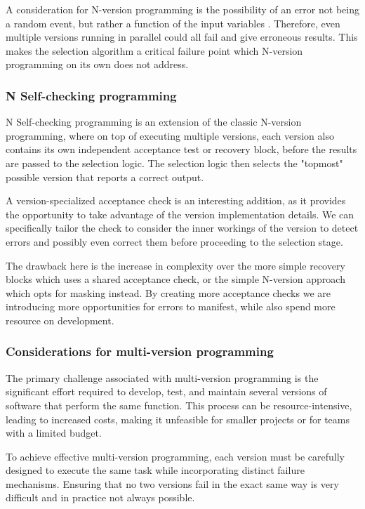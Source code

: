 \documentclass[12pt, letterpaper]{article}
\begin{document}
A consideration for N-version programming is the possibility of an error not being a random event, but rather a function of the input variables \cite{5326}. Therefore, even multiple versions running in parallel could all fail and give erroneous results. This makes the selection algorithm a critical failure point which N-version programming on its own does not address.

\subsubsection{N Self-checking programming}

N Self-checking programming is an extension of the classic N-version programming, where on top of executing multiple versions, each version also contains its own independent acceptance test or recovery block, before the results are passed to the selection logic. The selection logic then selects the "topmost" possible version that reports a correct output.

A version-specialized acceptance check is an interesting addition, as it provides the opportunity to take advantage of the version implementation details. We can specifically tailor the check to consider the inner workings of the version to detect errors and possibly even correct them before proceeding to the selection stage.

The drawback here is the increase in complexity over the more simple recovery blocks which uses a shared acceptance check, or the simple N-version approach which opts for masking instead. By creating more acceptance checks we are introducing more opportunities for errors to manifest, while also spend more resource on development.


\subsubsection{Considerations for multi-version programming}

The primary challenge associated with multi-version programming is the significant effort required to develop, test, and maintain several versions of software that perform the same function. This process can be resource-intensive, leading to increased costs, making it unfeasible for smaller projects or for teams with a limited budget.

To achieve effective multi-version programming, each version must be carefully designed to execute the same task while incorporating distinct failure mechanisms. Ensuring that no two versions fail in the exact same way is very difficult and in practice not always possible.
\end{document}
